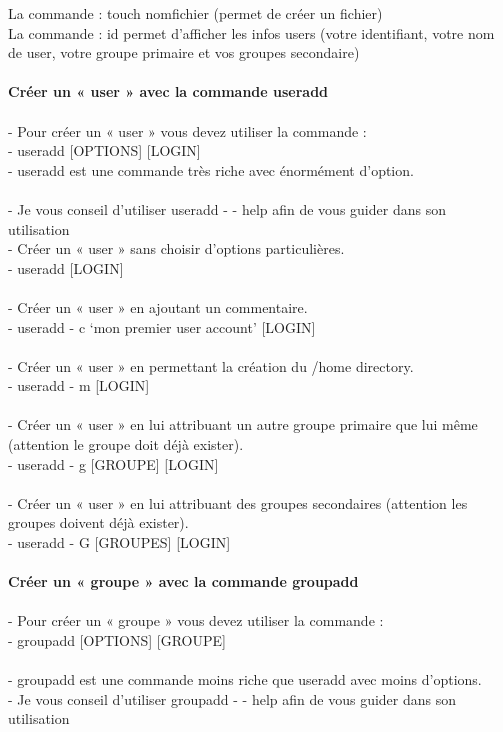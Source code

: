 \documentclass[10pt,a4paper]{article}
\begin{document}
La commande : touch nomfichier (permet de créer un fichier)\\
La commande : id permet d’afficher les infos users (votre identifiant, votre nom de user, votre groupe primaire et vos groupes secondaire)\\\\
{\large\textbf{Créer un « user » avec la commande useradd }}\\\\
- Pour créer un « user » vous devez utiliser la commande : \\
- useradd [OPTIONS] [LOGIN]  \\
- useradd est une commande très riche avec énormément d’option. \\\\
- Je vous conseil d’utiliser useradd - - help afin de vous guider dans son utilisation \\
- Créer un « user » sans choisir d’options particulières. \\
- useradd [LOGIN] \\\\
- Créer un « user » en ajoutant un commentaire. \\
- useradd - c ‘mon premier user account’ [LOGIN] \\\\
- Créer un « user » en permettant la création du /home directory. \\
- useradd - m [LOGIN] \\\\
- Créer un « user » en lui attribuant un autre groupe primaire que lui même (attention le groupe doit déjà exister). \\
- useradd - g [GROUPE] [LOGIN]  \\\\
- Créer un « user » en lui attribuant des groupes secondaires (attention les groupes doivent déjà exister). \\
- useradd - G [GROUPES] [LOGIN] \\\\
{\large\textbf{Créer un « groupe » avec la commande groupadd }}\\\\
- Pour créer un « groupe » vous devez utiliser la commande : \\
- groupadd [OPTIONS] [GROUPE]  \\\\
- groupadd est une commande moins riche que useradd avec moins d’options. \\
- Je vous conseil d’utiliser groupadd - - help afin de vous guider dans son utilisation\\
\end{document}
